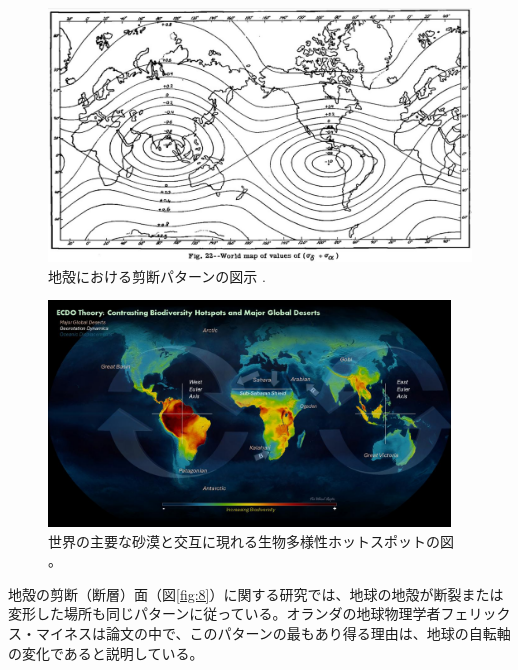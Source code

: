 \documentclass[10pt,twocolumn,letterpaper]{article}
\begin{document}
\begin{figure}[t]
\begin{center}
   \includegraphics[width=1\linewidth]{meinesz3.jpg}
\end{center}
   \caption{地殻における剪断パターンの図示 \cite{36}.}
\label{fig:8}

\label{fig:onecol}
\end{figure}

\begin{figure}[t]
\begin{center}
\includegraphics[width=0.95\textwidth]{biodiversity.jpg}
\end{center}
   \caption{世界の主要な砂漠と交互に現れる生物多様性ホットスポットの図 \cite{28}。}
\label{fig:9}
\end{figure}

地殻の剪断（断層）面（図\ref{fig:8}）に関する研究では、地球の地殻が断裂または変形した場所も同じパターンに従っている。オランダの地球物理学者フェリックス・マイネスは論文\cite{36}の中で、このパターンの最もあり得る理由は、地球の自転軸の変化であると説明している。
\end{document}

